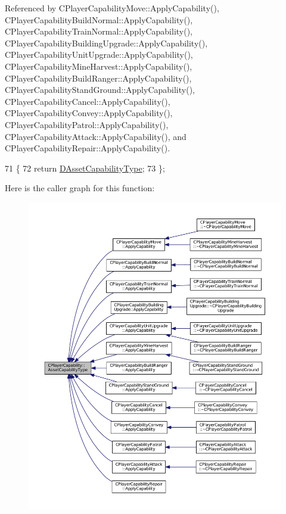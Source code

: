 Referenced by C\+Player\+Capability\+Move\+::\+Apply\+Capability(), C\+Player\+Capability\+Build\+Normal\+::\+Apply\+Capability(), C\+Player\+Capability\+Train\+Normal\+::\+Apply\+Capability(), C\+Player\+Capability\+Building\+Upgrade\+::\+Apply\+Capability(), C\+Player\+Capability\+Unit\+Upgrade\+::\+Apply\+Capability(), C\+Player\+Capability\+Mine\+Harvest\+::\+Apply\+Capability(), C\+Player\+Capability\+Build\+Ranger\+::\+Apply\+Capability(), C\+Player\+Capability\+Stand\+Ground\+::\+Apply\+Capability(), C\+Player\+Capability\+Cancel\+::\+Apply\+Capability(), C\+Player\+Capability\+Convey\+::\+Apply\+Capability(), C\+Player\+Capability\+Patrol\+::\+Apply\+Capability(), C\+Player\+Capability\+Attack\+::\+Apply\+Capability(), and C\+Player\+Capability\+Repair\+::\+Apply\+Capability().


\begin{DoxyCode}
71                                                         \{
72             \textcolor{keywordflow}{return} \hyperlink{classCPlayerCapability_a09011bc8c74c698bfb65f06a1840c6e1}{DAssetCapabilityType};
73         \};
\end{DoxyCode}
Here is the caller graph for this function\+:\nopagebreak
\begin{figure}[H]
\begin{center}
\leavevmode
\includegraphics[width=350pt]{classCPlayerCapability_a433bb196cd6ab6a932f1cac102b3aa98_icgraph}
\end{center}
\end{figure}
\hypertarget{classCPlayerCapability_ae96263e0950f496492f8baeb877b9554}{}\label{classCPlayerCapability_ae96263e0950f496492f8baeb877b9554} 

